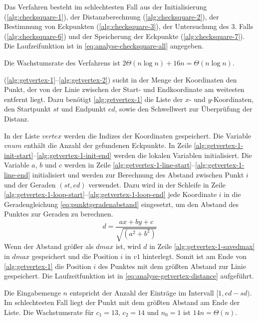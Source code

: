 Das Verfahren  besteht im schlechtesten Fall aus der Initialisierung
 (\autoref{alg:checksquare-1}), der Distanzberechnung (\autoref{alg:checksquare-2}), der Bestimmung von Eckpunkten
 (\autoref{alg:checksquare-3}), der Untersuchung des 3. Falls (\autoref{alg:checksquare-6}) und der Speicherung der
 Eckpunkte (\autoref{alg:checksquare-7}). Die Laufzeifunktion ist in \autoref{eq:analyse-checksquare-all} angegeben.

Die Wachstumsrate des Verfahrens ist $2\Theta(n \log n) + 16n = \Theta(n \log n)$.

 (\autoref{alg:getvertex-1}--\autoref{alg:getvertex-2}) sucht in der Menge der Koordinaten den
 Punkt, der von der Linie zwischen der Start- und Endkoordinate am weitesten entfernt liegt. Dazu benötigt
 \autoref{alg:getvertex-1} die Liste der $x$- und $y$-Koordinaten, den Startpunkt $\mathit{st}$ und Endpunkt
 $\mathit{ed}$, sowie den Schwellwert zur Überprüfung der Distanz.

In der Liste $\mathit{vertex}$ werden die Indizes der Koordinaten gespeichert. Die Variable $\mathit{vnum}$ enthält die
 Anzahl der gefundenen Eckpunkte. In Zeile \ref{alg:getvertex-1-init-start}--\ref{alg:getvertex-1-init-end} werden die
 lokalen Variablen initialisiert. Die Variable $a$, $b$ und $c$ werden in Zeile
 \ref{alg:getvertex-1-line-start}--\ref{alg:getvertex-1-line-end} initialisiert und werden zur Berechnung des Abstand
 zwischen Punkt $i$ und der Geraden $(\mathit{st},\mathit{ed})$ verwendet. Dazu wird in der Schleife in Zeile
 \ref{alg:getvertex-1-loop-start}--\ref{alg:getvertex-1-loop-end} jede Koordinate $i$ in die Geradengleichung
 \autoref{eq:punktgeradenabstand} eingesetzt, um den Abstand des Punktes zur Geraden zu berechnen.
\begin{equation}
	\label{eq:punktgeradenabstand}
	d = \frac{\mathit{ax} + \mathit{by} + c}{\sqrt{(a^2 + b^2)}}
\end{equation}
Wenn der Abstand größer als $\mathit{dmax}$ ist, wird $d$ in Zeile \ref{alg:getvertex-1-savedmax} in $\mathit{dmax}$
 gespeichert und die Position $i$ in $\mathit{v1}$ hinterlegt. Somit ist am Ende von \autoref{alg:getvertex-1} die
 Position $i$ des Punktes mit dem größten Abstand zur Linie gespeichert. Die Laufzeitfunktion ist in
 \autoref{eq:analyse-getvertex-distance} aufgeführt.

Die Eingabemenge $n$ entspricht der Anzahl der Einträge im Intervall $[1,\mathit{ed}-\mathit{sd})$. Im schlechtesten
 Fall liegt der Punkt mit dem größten Abstand am Ende der Liste. Die Wachstumsrate für $c_{1} = 13$, $c_{2} = 14$ und
 $n_{0} = 1$ ist $14n = \Theta(n)$.

